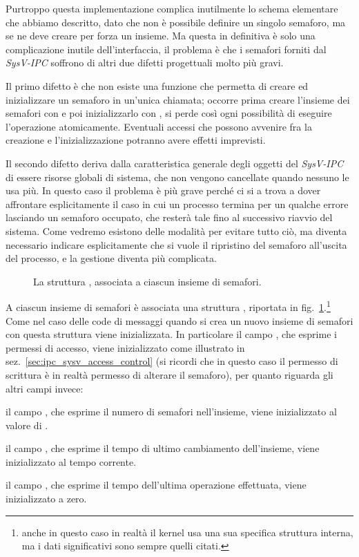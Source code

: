 Purtroppo questa implementazione complica inutilmente lo schema elementare che
abbiamo descritto, dato che non è possibile definire un singolo semaforo, ma
se ne deve creare per forza un insieme.  Ma questa in definitiva è solo una
complicazione inutile dell'interfaccia, il problema è che i semafori forniti
dal \textit{SysV-IPC} soffrono di altri due difetti progettuali molto più
gravi.

Il primo difetto è che non esiste una funzione che permetta di creare ed
inizializzare un semaforo in un'unica chiamata; occorre prima creare l'insieme
dei semafori con  e poi inizializzarlo con , si
perde così ogni possibilità di eseguire l'operazione atomicamente. Eventuali
accessi che possono avvenire fra la creazione e l'inizializzazione potranno
avere effetti imprevisti.

Il secondo difetto deriva dalla caratteristica generale degli oggetti del
\textit{SysV-IPC} di essere risorse globali di sistema, che non vengono
cancellate quando nessuno le usa più. In questo caso il problema è più grave
perché ci si a trova a dover affrontare esplicitamente il caso in cui un
processo termina per un qualche errore lasciando un semaforo occupato, che
resterà tale fino al successivo riavvio del sistema. Come vedremo esistono
delle modalità per evitare tutto ciò, ma diventa necessario indicare
esplicitamente che si vuole il ripristino del semaforo all'uscita del
processo, e la gestione diventa più complicata.

\begin{figure}[!htb]
  \footnotesize \centering
  \begin{minipage}[c]{.85\textwidth}
  \end{minipage} 
  \normalsize 
  \caption{La struttura , associata a ciascun insieme di
    semafori.}
  \label{fig:ipc_semid_ds}
\end{figure}

A ciascun insieme di semafori è associata una struttura ,
riportata in fig.~\ref{fig:ipc_semid_ds}.\footnote{anche in questo caso in
  realtà il kernel usa una sua specifica struttura interna, ma i dati
  significativi sono sempre quelli citati.}  Come nel caso delle code di
messaggi quando si crea un nuovo insieme di semafori con  questa
struttura viene inizializzata. In particolare il campo , che
esprime i permessi di accesso, viene inizializzato come illustrato in
sez.~\ref{sec:ipc_sysv_access_control} (si ricordi che in questo caso il
permesso di scrittura è in realtà permesso di alterare il semaforo), per
quanto riguarda gli altri campi invece:
\begin{itemize*}
\item il campo , che esprime il numero di semafori
  nell'insieme, viene inizializzato al valore di .
\item il campo , che esprime il tempo di ultimo cambiamento
  dell'insieme, viene inizializzato al tempo corrente.
\item il campo , che esprime il tempo dell'ultima operazione
  effettuata, viene inizializzato a zero.
\end{itemize*}

